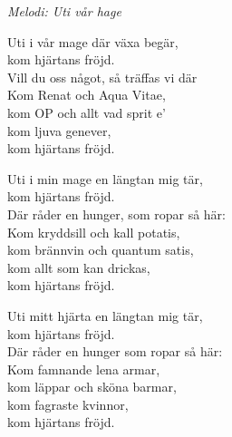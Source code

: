 {\footnotesize\textit{Melodi: Uti vår hage}}\par
\vspace{10pt}
Uti i vår mage där växa begär,\\
kom hjärtans fröjd.\\
Vill du oss något, så träffas vi där\\
Kom Renat och Aqua Vitae,\\
kom OP och allt vad sprit e'\\
kom ljuva genever,\\
kom hjärtans fröjd.\par
\vspace{10pt}
Uti i min mage en längtan mig tär,\\
kom hjärtans fröjd.\\
Där råder en hunger, som ropar så här:\\
Kom kryddsill och kall potatis,\\
kom brännvin och quantum satis,\\
kom allt som kan drickas,\\
kom hjärtans fröjd.\par
\vspace{10pt}
Uti mitt hjärta en längtan mig tär,\\
kom hjärtans fröjd.\\
Där råder en hunger som ropar så här:\\
Kom famnande lena armar,\\
kom läppar och sköna barmar,\\
kom fagraste kvinnor,\\
kom hjärtans fröjd.
